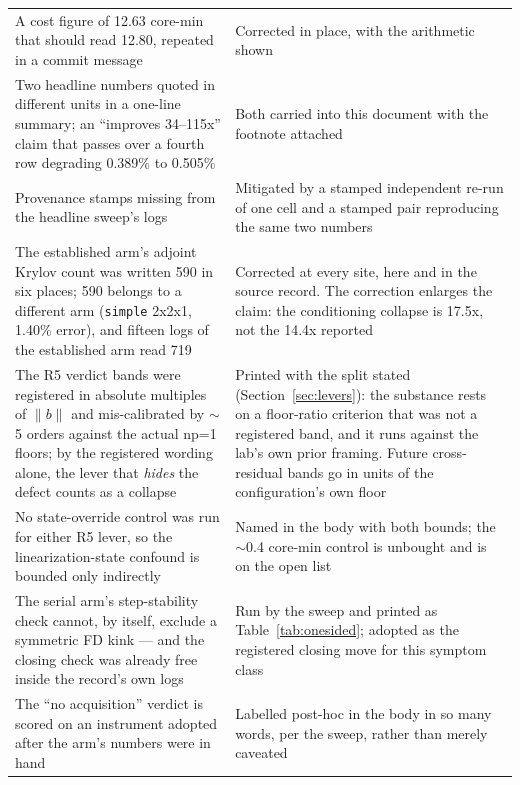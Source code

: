 \documentclass[11pt,a4paper]{article}
\begin{document}
\begin{table}[htbp]
\begin{tabular}{@{}L{7.4cm}L{7.4cm}@{}}
A cost figure of 12.63 core-min that should read 12.80, repeated in a commit message & Corrected in place, with the arithmetic shown \\
Two headline numbers quoted in different units in a one-line summary; an ``improves 34--115x'' claim that passes over a fourth row degrading 0.389\% to 0.505\% & Both carried into this document with the footnote attached \\
Provenance stamps missing from the headline sweep's logs & Mitigated by a stamped independent re-run of one cell and a stamped pair reproducing the same two numbers \\
\addlinespace
The established arm's adjoint Krylov count was written 590 in six places; 590 belongs to a different arm (\texttt{simple} 2x2x1, 1.40\% error), and fifteen logs of the established arm read 719 & Corrected at every site, here and in the source record. The correction enlarges the claim: the conditioning collapse is 17.5x, not the 14.4x reported \\
\addlinespace
The R5 verdict bands were registered in absolute multiples of \(\lVert b\rVert\) and mis-calibrated by \(\sim\)5 orders against the actual np=1 floors; by the registered wording alone, the lever that \emph{hides} the defect counts as a collapse & Printed with the split stated (Section~\ref{sec:levers}): the substance rests on a floor-ratio criterion that was not a registered band, and it runs against the lab's own prior framing. Future cross-residual bands go in units of the configuration's own floor \\
\addlinespace
No state-override control was run for either R5 lever, so the linearization-state confound is bounded only indirectly & Named in the body with both bounds; the \(\sim\)0.4 core-min control is unbought and is on the open list \\
\addlinespace
The serial arm's step-stability check cannot, by itself, exclude a symmetric FD kink --- and the closing check was already free inside the record's own logs & Run by the sweep and printed as Table~\ref{tab:onesided}; adopted as the registered closing move for this symptom class \\
\addlinespace
The ``no acquisition'' verdict is scored on an instrument adopted after the arm's numbers were in hand & Labelled post-hoc in the body in so many words, per the sweep, rather than merely caveated \\
\bottomrule
\end{tabular}
\end{table}
\end{document}
